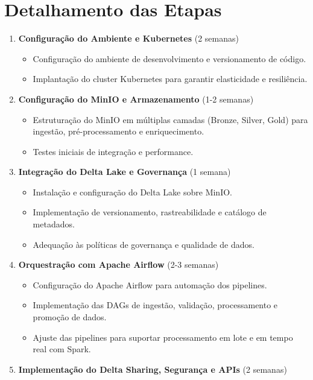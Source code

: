 \section{Detalhamento das Etapas}

\begin{enumerate}
    \item \textbf{Configuração do Ambiente e Kubernetes} (2 semanas)
    \begin{itemize}
        \item Configuração do ambiente de desenvolvimento e versionamento de código.
        \item Implantação do cluster Kubernetes para garantir elasticidade e resiliência.
    \end{itemize}
    \item \textbf{Configuração do MinIO e Armazenamento} (1-2 semanas)
    \begin{itemize}
        \item Estruturação do MinIO em múltiplas camadas (Bronze, Silver, Gold) para ingestão, pré-processamento e enriquecimento.
        \item Testes iniciais de integração e performance.
    \end{itemize}
    \item \textbf{Integração do Delta Lake e Governança} (1 semana)
    \begin{itemize}
        \item Instalação e configuração do Delta Lake sobre MinIO.
        \item Implementação de versionamento, rastreabilidade e catálogo de metadados.
        \item Adequação às políticas de governança e qualidade de dados.
    \end{itemize}
    \item \textbf{Orquestração com Apache Airflow} (2-3 semanas)
    \begin{itemize}
        \item Configuração do Apache Airflow para automação dos pipelines.
        \item Implementação das DAGs de ingestão, validação, processamento e promoção de dados.
        \item Ajuste das pipelines para suportar processamento em lote e em tempo real com Spark.
    \end{itemize}
    \item \textbf{Implementação do Delta Sharing, Segurança e APIs} (2 semanas)
    \begin{itemize}

\end{itemize}
\end{enumerate}
